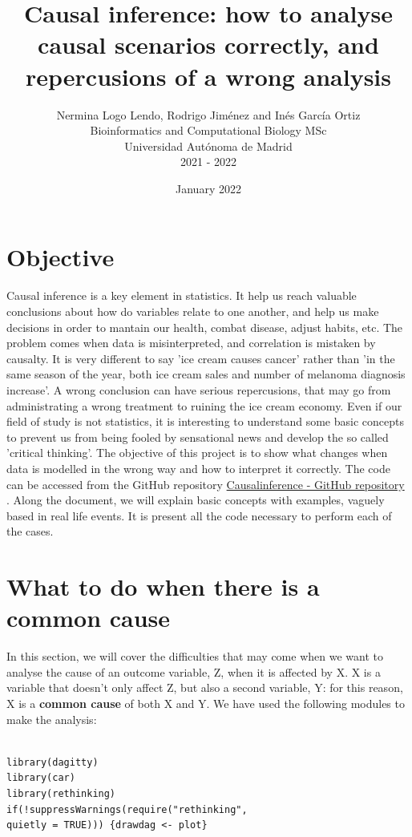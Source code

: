 \documentclass{article}
\title{Causal inference: how to analyse causal scenarios correctly, and repercusions of a wrong analysis}
\author{Nermina Logo Lendo, Rodrigo Jiménez and Inés García Ortiz\\
      Bioinformatics and Computational Biology MSc\\
      Universidad Autónoma de Madrid\\
      2021 - 2022}
\date{January 2022}
\begin{document}
\maketitle
\tableofcontents
\newpage
\section{Objective}

Causal inference is a key element in statistics. It help us reach valuable conclusions about how do variables relate to one another, and help us make decisions in order to mantain our health, combat disease, adjust habits, etc. The problem comes when data is misinterpreted, and correlation is mistaken by causalty. It is very different to say 'ice cream causes cancer' rather than 'in the same season of the year, both ice cream sales and number of melanoma diagnosis increase'. A wrong conclusion can have serious repercusions, that may go from administrating a wrong treatment to ruining the ice cream economy. Even if our field of study is not statistics, it is interesting to understand some basic concepts to prevent us from being fooled by sensational news and develop the so called 'critical thinking'. 
The objective of this project is to show what changes when data is modelled in the wrong way and how to interpret it correctly. The code can be accessed from the GitHub repository \href{https://github.com/igarcia17/causal_inference}{Causalinference - GitHub repository} .
Along the document, we will explain basic concepts with examples, vaguely based in real life events. It is present all the code necessary to perform each of the cases.

\newpage

\section{What to do when there is a common cause}

In this section, we will cover the difficulties that may come when we want to analyse the cause of an outcome variable, Z, when it is affected by X. X is a variable that doesn't only affect Z, but also a second variable, Y: for this reason, X is a \textbf{common cause} of both X and Y.
We have used the following modules to make the analysis:

\begin{lstlisting}

library(dagitty)
library(car)
library(rethinking)
if(!suppressWarnings(require("rethinking", 
quietly = TRUE))) {drawdag <- plot}
  
\end{lstlisting}
\end{document}
